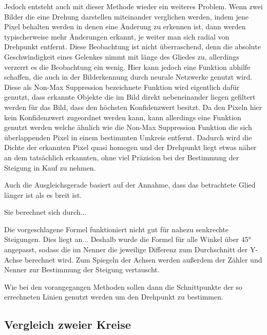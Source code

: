 
Jedoch entsteht auch mit dieser Methode wieder ein weiteres Problem.
Wenn zwei Bilder die eine Drehung darstellen miteinander verglichen werden, indem jene Pixel behalten werden in denen eine Änderung zu erkennen ist, dann werden typischerweise mehr Änderungen erkannt, je weiter man sich radial von Drehpunkt entfernt.
Diese Beobachtung ist nicht überraschend, denn die absolute Geschwindigkeit eines Gelenkes nimmt mit länge des Gliedes zu, allerdings verzerrt es die Beobachtung ein wenig.
Hier kann jedoch eine Funktion abhilfe schaffen, die auch in der Bilderkennung durch neurale Netzwerke genutzt wird.
Diese als Non-Max Suppression %
bezeichnete Funktion wird eigentlich dafür genutzt, dass erkannte Objekte die im Bild direkt nebeneinander liegen gefiltert werden für das Bild, dass den höchsten Konfidenzwert besitzt.
Da den Pixeln hier kein Konfidenzwert zugeordnet werden kann, kann allerdings eine Funktion genutzt werden welche ähnlich wie die Non-Max Suppression Funktion %
die sich überlappenden Pixel in einem bestimmten Umkreis entfernt.
Dadurch wird die Dichte der erkannten Pixel quasi homogen und der Drehpunkt liegt etwas näher an dem tatsächlich erkannten, ohne viel Präzision bei der Bestimmung der Steigung in Kauf zu nehmen.



Auch die Ausgleichsgerade basiert auf der Annahme, dass das betrachtete Glied länger ist als es breit ist.

Sie berechnet sich durch... %

Die vorgeschlagene Formel funktioniert nicht gut für nahezu senkrechte Steigungen.
Dies liegt an... %
Deshalb wurde die Formel für alle Winkel über 45° angepasst, sodass die im Nenner die jeweilige Differenz zum Durchschnitt der Y-Achse berechnet wird.
Zum Spiegeln der Achsen werden außerdem der Zähler und Nenner zur Bestimmung der Steigung vertauscht.


Wie bei den vorangegangen Methoden sollen dann die Schnittpunkte der so errechneten Linien genutzt werden um den Drehpunkt zu bestimmen.

\subsection{Vergleich zweier Kreise}

